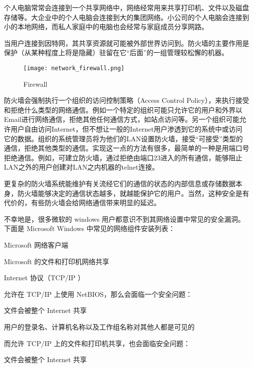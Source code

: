 个人电脑常常会连接到一个共享网络中，网络经常用来共享打印机、文件以及磁盘存储等。大企业中的个人电脑会连接到大的集团网络。小公司的个人电脑会连接到小的本地网络，而私人家庭中的电脑也会经常与家庭成员分享网路。

当用户连接到因特网，其共享资源就可能被外部世界访问到。防火墙的主要作用是保护（从某种程度上将是隐藏）驻留在它“后面”的一组管理较松懈的机器。

\begin{figure}[!h]
\centering
\texttt{[image: network\_firewall.png]}
\caption{Firewall}
\label{network_firewall}
\end{figure}


防火墙会强制执行一个组织的访问控制策略（Access Control Policy），来执行接受和拒绝什么类型的网络通信。例如一个特定的组织可能只允许它的用户和外界以Email进行网络通信，拒绝其他任何通信方式，如站点访问等。另一个组织可能允许用户自由访问Internet，但不想让一般的Internet用户渗透到它的系统中或访问它的数据。组织的系统管理员将为他们的LAN设置防火墙，接受“可接受”类型的通信，拒绝其他类型的通信。实现这一点的方法有很多，最简单的一种是用端口号拒绝通信。例如，可建立防火墙，通过拒绝由端口23进入的所有通信，能够阻止LAN之外的用户创建对LAN之内机器的telnet连接。


更复杂的防火墙系统能维护有关流经它们的通信的状态的内部信息或存储数据本身，防火墙能够决定的通信状态越多，就越能保护它的用户。当然，这种安全是有代价的，有些防火墙会给网络通信带来明显的延迟。

不幸地是，很多微软的 windows 用户都意识不到其网络设置中常见的安全漏洞。下面是 Microsoft Windows 中常见的网络组件安装列表：

\begin{compactitem}
\item Microsoft 网络客户端
\item Microsoft 的文件和打印机网络共享
\item Internet 协议（TCP/IP ）
\end{compactitem}

允许在 TCP/IP 上使用 NetBIOS，那么会面临一个安全问题：

\begin{compactitem}
\item 文件会被整个 Internet 共享
\item 用户的登录名、计算机名称以及工作组名称对其他人都是可见的
\end{compactitem}

而允许 TCP/IP 上的文件和打印机共享，也会面临安全问题：

\begin{compactitem}
\item 文件会被整个 Internet 共享
\end{compactitem}

